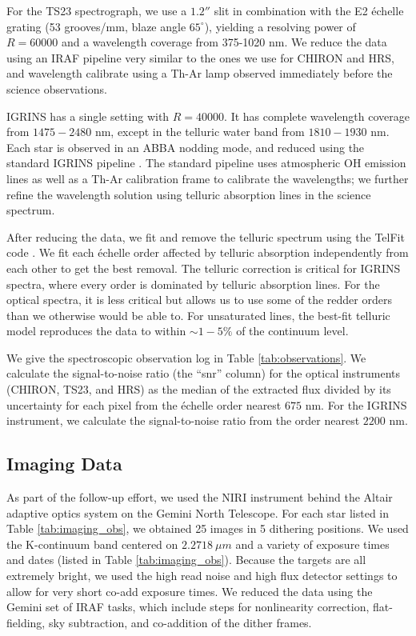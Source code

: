 \documentclass{emulateapj}
\begin{document}
For the TS23 spectrograph, we use a $1.2''$ slit in combination with the E2 \'echelle grating (53 grooves/mm, blaze angle $65^{\circ}$), yielding a resolving power of $R=60000$ and a wavelength coverage from 375-1020 nm. We reduce the data using an IRAF pipeline very similar to the ones we use for CHIRON and HRS, and wavelength calibrate using a Th-Ar lamp observed immediately before the science observations.

IGRINS has a single setting with $R = 40000$. It has complete wavelength coverage from $1475-2480$ nm, except in the telluric water band from $1810 - 1930$ nm. Each star is observed in an ABBA nodding mode, and reduced using the standard IGRINS pipeline \citep{IGRINS_plp_v2}. The standard pipeline uses atmospheric OH emission lines as well as a Th-Ar calibration frame to calibrate the wavelengths; we further refine the wavelength solution using telluric absorption lines in the science spectrum.

After reducing the data, we fit and remove the telluric spectrum using the TelFit code \citep{Gullikson2014}. We fit each \'echelle order affected by telluric absorption independently from each other to get the best removal. The telluric correction is critical for IGRINS spectra, where every order is dominated by telluric absorption lines. For the optical spectra, it is less critical but allows us to use some of the redder orders than we otherwise would be able to. For unsaturated lines, the best-fit telluric model reproduces the data to within $\sim 1-5\%$ of the continuum level.

We give the spectroscopic observation log in Table \ref{tab:observations}. We calculate the signal-to-noise ratio (the ``snr'' column) for the optical instruments (CHIRON, TS23, and HRS) as the median of the extracted flux divided by its uncertainty for each pixel from the \'echelle order nearest $675$ nm. For the IGRINS instrument, we calculate the signal-to-noise ratio from the order nearest $2200$ nm.


\subsection{Imaging Data}
As part of the follow-up effort, we used the NIRI instrument behind the Altair adaptive optics system on the Gemini North Telescope. For each star listed in Table \ref{tab:imaging_obs}, we obtained 25 images in 5 dithering positions. We used the K-continuum band centered on $2.2718\ \mu m$ and a variety of exposure times and dates (listed in Table \ref{tab:imaging_obs}). Because the targets are all extremely bright, we used the high read noise and high flux detector settings to allow for very short co-add exposure times. We reduced the data using the Gemini set of IRAF tasks, which include steps for nonlinearity correction, flat-fielding, sky subtraction, and co-addition of the dither frames. 
\end{document}
